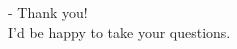 \begin{frame}[title]{-}
\centering
{Thank you!}\\[0.8em]
{I'd be happy to take your questions.}
\end{frame}
